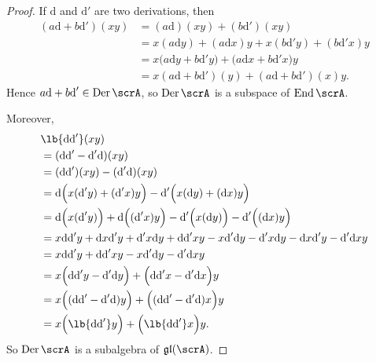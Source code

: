 \documentclass{article}
\DeclarePairedDelimiter\lb\lbrack\rbrack
\DeclareMathOperator{\End}{End}
\DeclareMathOperator{\Der}{Der}
\newcommand{\dd}{\ensuremath{\text{d}}}
\newcommand*\glalg{\ensuremath{\mathfrak{gl}}}
\begin{document}
\begin{proof}
    If $\dd$ and $\dd'$ are two derivations, then
    \begin{align*}
        (a\dd + b\dd')(xy)
        &=
        (a\dd)(xy) + (b\dd')(xy)
        \\
        &=
        x(a\dd y) + (a\dd x)y
        +
        x(b\dd'y) + (b\dd'x)y
        \\
        &=
        x
        \Big(
            a\dd y + b\dd'y
        \Big)
        +
        \Big(
            a\dd x + b\dd'x
        \Big)
        y
        \\
        &=
        x(a\dd + b\dd')(y)
        +
        (a\dd + b\dd')(x)y.
    \end{align*}
    Hence $a\dd + b\dd' \in \Der \scrA$, so $\Der \scrA$ is a subspace of $\End \scrA$.

    Moreover, 
    \begin{align*}
        &\lb{\dd\dd'}(xy)
        \\
        &=
        (\dd\dd' - \dd'\dd)(xy)
        \\
        &=
        (\dd\dd')(xy) - (\dd'\dd)(xy)
        \\
        &=
        \dd
        \Big(
            x(\dd'y) + (\dd'x)y
        \Big)
        -
        \dd'
        \Big(
            x(\dd y) + (\dd x)y
        \Big)
        \\
        &=
        \dd\Big(x(\dd'y)\Big) 
        +
        \dd\Big((\dd'x)y\Big) 
        -
        \dd'\Big(x(\dd y)\Big) 
        -
        \dd'\Big((\dd x)y\Big) 
        \\
        &=
        x\dd\dd'y
        +
        \dd x \dd' y
        +
        \dd'x \dd y
        +
        \dd\dd'x y
        -
        x\dd'\dd y
        -
        \dd' x \dd y
        -
        \dd x \dd' y
        -
        \dd' \dd x y
        \\
        &=
        x\dd\dd'y
        +
        \dd\dd'x y
        -
        x\dd'\dd y
        -
        \dd' \dd x y
        \\
        &=
        x
        \Big(
            \dd\dd'y - \dd'\dd y
        \Big)
        +
        \Big(
            \dd\dd'x - \dd'\dd x 
        \Big)
        y
        \\
        &=
        x\Big((\dd\dd' - \dd'\dd)y\Big)
        +
        \Big((\dd\dd' - \dd'\dd)x\Big)y
        \\
        &=
        x\Big(\lb{\dd\dd'}y\Big)
        +
        \Big(\lb{\dd\dd'}x\Big)y.
    \end{align*}
    So $\Der \scrA$ is a subalgebra of $\glalg(\scrA)$.
\end{proof}
\end{document}
